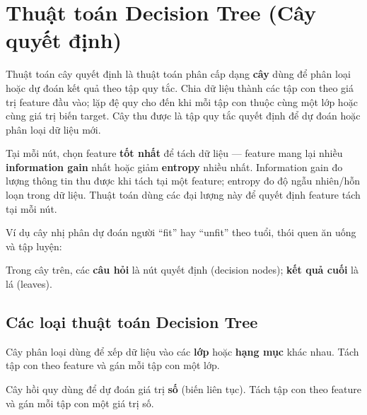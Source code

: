 \section{Thuật toán Decision Tree (Cây quyết định)}
\label{sec:decision-tree}

\begin{dinhnghia}[title={Decision Tree Algorithm}]
Thuật toán cây quyết định là thuật toán phân cấp dạng \textbf{cây} dùng để phân loại hoặc dự đoán kết quả theo tập quy tắc.
Chia dữ liệu thành các tập con theo giá trị feature đầu vào; lặp đệ quy cho đến khi mỗi tập con thuộc cùng một lớp hoặc cùng giá trị biến target.
Cây thu được là tập quy tắc quyết định để dự đoán hoặc phân loại dữ liệu mới.
\end{dinhnghia}

\begin{phuongphap}[title={Chọn feature tách tại mỗi nút}]
Tại mỗi nút, chọn feature \textbf{tốt nhất} để tách dữ liệu --- feature mang lại nhiều \textbf{information gain} nhất hoặc giảm \textbf{entropy} nhiều nhất.
Information gain đo lượng thông tin thu được khi tách tại một feature; entropy đo độ ngẫu nhiên/hỗn loạn trong dữ liệu.
Thuật toán dùng các đại lượng này để quyết định feature tách tại mỗi nút.
\end{phuongphap}

\begin{vidu}[title={Ví dụ cây nhị phân}]
Ví dụ cây nhị phân dự đoán người ``fit'' hay ``unfit'' theo tuổi, thói quen ăn uống và tập luyện:


Trong cây trên, các \textbf{câu hỏi} là nút quyết định (decision nodes); \textbf{kết quả cuối} là lá (leaves).
\end{vidu}

\subsection{Các loại thuật toán Decision Tree}

\begin{dinhnghia}[title={Classification Tree}]
Cây phân loại dùng để xếp dữ liệu vào các \textbf{lớp} hoặc \textbf{hạng mục} khác nhau.
Tách tập con theo feature và gán mỗi tập con một lớp.
\end{dinhnghia}

\begin{dinhnghia}[title={Regression Tree}]
Cây hồi quy dùng để dự đoán giá trị \textbf{số} (biến liên tục).
Tách tập con theo feature và gán mỗi tập con một giá trị số.
\end{dinhnghia}

